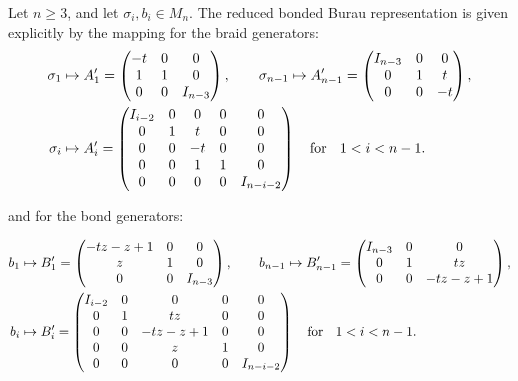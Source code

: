 \documentclass[10pt,a4paper]{amsart}
\begin{document}
\begin{theorem}
Let $n \geq 3$, and let $\sigma_i, b_i \in M_n$. The reduced bonded Burau representation is given explicitly by the mapping
for the braid generators:
\begin{align}
\sigma_1 &
\mapsto A_1' =
\begin{pmatrix}
-t & 0 & 0 \\
1 & 1 & 0 \\
0 & 0 & I_{n-3}
\end{pmatrix}, \qquad
\sigma_{n-1}
\mapsto A_{n-1}' =
\begin{pmatrix}
I_{n-3} & 0 & 0 \\
0 & 1 & t \\
0 & 0 & -t
\end{pmatrix},
\notag
\\
\sigma_{i} & \mapsto 
A_i' =
\begin{pmatrix}
I_{i-2} & 0 & 0 & 0 & 0 \\
0 & 1 & t & 0 & 0 \\
0 & 0 & -t & 0 & 0 \\
0 & 0 & 1 & 1 & 0 \\
0 & 0 & 0 & 0 & I_{n-i-2}
\end{pmatrix}\quad \text{for \; $1 < i < n-1$}. \notag
\end{align} 

and for the bond generators:

\begin{align}
b_1 &
\mapsto B_1' =
\begin{pmatrix}
-tz - z + 1 & 0 & 0 \\
z & 1 & 0 \\
0 & 0 & I_{n-3}
\end{pmatrix}, \qquad
b_{n-1}
\mapsto B_{n-1}' =
\begin{pmatrix}
I_{n-3} & 0 & 0 \\
0 & 1 & tz \\
0 & 0 & -tz - z + 1
\end{pmatrix},
\notag
\\
b_{i} &\mapsto 
B_i' =
\begin{pmatrix}
I_{i-2} & 0 & 0 & 0 & 0 \\
0 & 1 & tz & 0 & 0 \\
0 & 0 & -tz - z + 1 & 0 & 0 \\
0 & 0 & z & 1 & 0 \\
0 & 0 & 0 & 0 & I_{n-i-2}
\end{pmatrix}\quad \text{for \; $1 < i < n-1$}. \notag
\end{align} 



\end{theorem}
\end{document}
